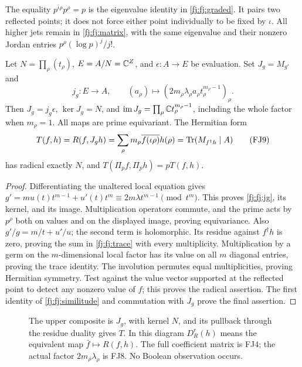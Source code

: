 The equality $\overline{p^{\iota\rho}}p^\rho=p$ is the eigenvalue
identity in \eqref{fj:fj:graded}. It pairs two reflected points; it does
not force either point individually to be fixed by $\iota$.
All higher jets remain in \eqref{fj:fj:matrix}, with the same eigenvalue
and their nonzero Jordan entries $p^\rho(\log p)^j/j!$.

\begin{theorem}
\label{fj:thm:jacobian}
Let $N=\prod_\rho(t_\rho)$, $E=A/N=\mathbb C^Z$, and
$\epsilon:A\to E$ be evaluation. Set $J_g=M_{g'}$ and
\[
 j_g:E\longrightarrow A,\qquad
 (a_\rho)\longmapsto
 (2m_\rho\lambda_\rho a_\rho t_\rho^{m_\rho-1})_\rho.
 \tag{FJ8}\label{fj:fj:jg}
\]
Then $J_g=j_g\epsilon$, $\ker J_g=N$, and
$\operatorname{im} J_g=\prod_\rho\mathbb C t_\rho^{m_\rho-1}$, including the whole factor
when $m_\rho=1$. All maps are prime equivariant. The Hermitian form
\[
 T(f,h)=R(f,J_gh)
       =\sum_\rho m_\rho\overline{f(\iota\rho)}h(\rho)
       =\operatorname{Tr}(M_{f^\dagger h}\mid A)
 \tag{FJ9}\label{fj:fj:trace}
\]
has radical exactly $N$, and $T(\Pi_pf,\Pi_ph)=pT(f,h)$.
\end{theorem}
\begin{proof}
Differentiating the unaltered local equation gives
$g'=mu(t)t^{m-1}+u'(t)t^m\equiv2m\lambda t^{m-1}\pmod {t^m}$.
This proves \eqref{fj:fj:jg}, its kernel, and its image. Multiplication
operators commute, and the prime acts by $p^\rho$ both on values and
on the displayed image, proving equivariance. Also
$g'/g=m/t+u'/u$; the second term is holomorphic. Its residue against
$f^\dagger h$ is zero, proving the sum in \eqref{fj:fj:trace} with every
multiplicity. Multiplication by a germ on the $m$-dimensional local
factor has its value on all $m$ diagonal entries, proving the trace
identity. The involution permutes equal multiplicities, proving
Hermitian symmetry. Test against the value vector supported at the
reflected point to detect any nonzero value of $f$; this proves the
radical assertion. The first identity of \eqref{fj:fj:similitude} and
commutation with $J_g$ prove the final assertion.
\end{proof}

\begin{figure}[ht]
\centering
{}
\caption{The upper composite is $J_g$, with kernel $N$, and its
pullback through the residue duality gives $T$. In this diagram
$D_R^r(h)$ means the equivalent map $\bar f\mapsto R(f,h)$.
The full coefficient matrix is FJ4; the actual factor
$2m_\rho\lambda_\rho$ is FJ8. No Boolean observation occurs.}
\label{fj:fig:jacobian}
\end{figure}

